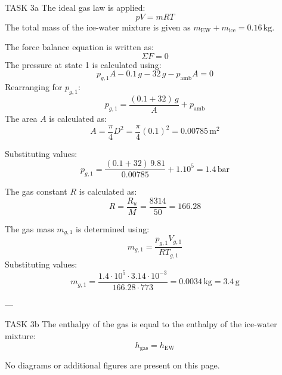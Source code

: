TASK 3a  
The ideal gas law is applied:  
\[
pV = mRT
\]  
The total mass of the ice-water mixture is given as \( m_{\text{EW}} + m_{\text{ice}} = 0.16 \, \text{kg} \).  

The force balance equation is written as:  
\[
\Sigma F = 0
\]  
The pressure at state 1 is calculated using:  
\[
p_{g,1} A - 0.1 \, g - 32 \, g - p_{\text{amb}} A = 0
\]  
Rearranging for \( p_{g,1} \):  
\[
p_{g,1} = \frac{(0.1 + 32) \, g}{A} + p_{\text{amb}}
\]  
The area \( A \) is calculated as:  
\[
A = \frac{\pi}{4} D^2 = \frac{\pi}{4} (0.1)^2 = 0.00785 \, \text{m}^2
\]  

Substituting values:  
\[
p_{g,1} = \frac{(0.1 + 32) \, 9.81}{0.00785} + 1.10^5 = 1.4 \, \text{bar}
\]  

The gas constant \( R \) is calculated as:  
\[
R = \frac{R_u}{M} = \frac{8314}{50} = 166.28
\]  

The gas mass \( m_{g,1} \) is determined using:  
\[
m_{g,1} = \frac{p_{g,1} V_{g,1}}{R T_{g,1}}
\]  
Substituting values:  
\[
m_{g,1} = \frac{1.4 \cdot 10^5 \cdot 3.14 \cdot 10^{-3}}{166.28 \cdot 773} = 0.0034 \, \text{kg} = 3.4 \, \text{g}
\]  

---

TASK 3b  
The enthalpy of the gas is equal to the enthalpy of the ice-water mixture:  
\[
h_{\text{gas}} = h_{\text{EW}}
\]  

No diagrams or additional figures are present on this page.